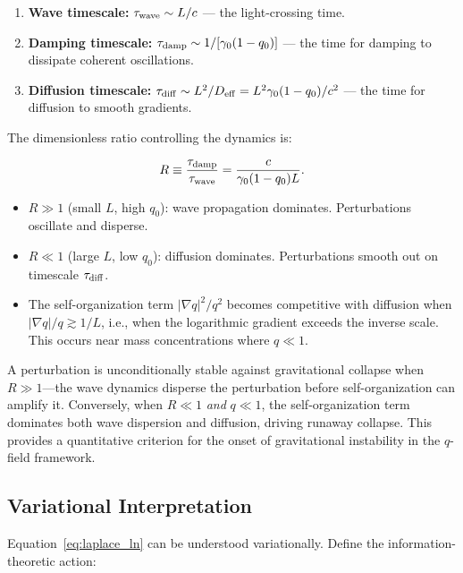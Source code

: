 \documentclass[aps,prd,twocolumn,showpacs,superscriptaddress,preprintnumbers]{revtex4-2}
\begin{document}
\begin{enumerate}
    \item \textbf{Wave timescale:} $\tau_{\rm wave} \sim L/c$ --- the light-crossing time.
    \item \textbf{Damping timescale:} $\tau_{\rm damp} \sim 1/[\gamma_0(1-q_0)]$ --- the time for damping to dissipate coherent oscillations.
    \item \textbf{Diffusion timescale:} $\tau_{\rm diff} \sim L^2/D_{\rm eff} = L^2\gamma_0(1-q_0)/c^2$ --- the time for diffusion to smooth gradients.
\end{enumerate}

The dimensionless ratio controlling the dynamics is:

\begin{equation}
R \equiv \frac{\tau_{\rm damp}}{\tau_{\rm wave}} = \frac{c}{\gamma_0(1-q_0)L}.
\label{eq:stability_R}
\end{equation}

\begin{itemize}
    \item $R\gg1$ (small $L$, high $q_0$): wave propagation dominates. Perturbations oscillate and disperse.
    \item $R\ll1$ (large $L$, low $q_0$): diffusion dominates. Perturbations smooth out on timescale $\tau_{\rm diff}$.
    \item The self-organization term $|\nabla q|^2/q^2$ becomes competitive with diffusion when $|\nabla q|/q \gtrsim 1/L$, i.e., when the logarithmic gradient exceeds the inverse scale. This occurs near mass concentrations where $q\ll1$.
\end{itemize}

A perturbation is unconditionally stable against gravitational collapse when $R\gg1$---the wave dynamics disperse the perturbation before self-organization can amplify it.
Conversely, when $R\ll1$ \emph{and} $q\ll1$, the self-organization term dominates both wave dispersion and diffusion, driving runaway collapse.
This provides a quantitative criterion for the onset of gravitational instability in the $q$-field framework.

\subsection{Variational Interpretation}

Equation~\eqref{eq:laplace_ln} can be understood variationally.
Define the information-theoretic action:
\end{document}

